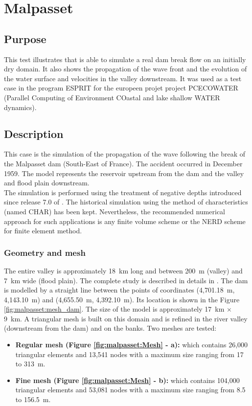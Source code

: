 \chapter{Malpasset}
\section{Purpose}
%
This test illustrates that  is able to simulate a real dam break flow
on an initially dry domain. It also shows the propagation of the wave front
and the evolution of the water surface and velocities in the valley downstream.
It was used as a test case in the program ESPRIT for the europeen projet project
PCECOWATER (Parallel Computing of Environment COastal and lake shallow WATER dynamics).
%
\section{Description}
%
This case is the simulation of the propagation of the wave following the break
of the Malpasset dam (South-East of France).
The accident occurred in December 1959.
The model represents the reservoir upstream from the dam and the valley and
flood plain downstream. \\

The simulation is performed using the treatment of negative depths introduced
since release 7.0 of .
The historical simulation using the method of characteristics (named CHAR) has
been kept.
Nevertheless, the recommended numerical approach for such applications is any
finite volume scheme or the NERD scheme for finite element method.

\subsection{Geometry and mesh}
The entire valley is approximately 18~km long and between 200~m (valley) and
7~km wide (flood plain).
The complete study is described in details in \cite{Hervouet2007}.
The dam is modelled by a straight line between the points of coordinates
(4,701.18~m, 4,143.10~m) and (4,655.50~m, 4,392.10~m).
Its location is shown in the Figure \ref{fig:malpasset:mesh_dam}.
The size of the model is approximately  17~km $\times$ 9~km.
A triangular mesh is built on this domain and is refined in the river valley
(downstream from the dam) and on the banks.
Two meshes are tested:
\begin{itemize}
\item \textbf{Regular mesh (Figure \ref{fig:malpasset:Mesh} - a):}
which contains 26,000 triangular elements and 13,541 nodes with a maximum size
ranging from 17 to 313~m.\\
\item \textbf{Fine mesh (Figure \ref{fig:malpasset:Mesh} - b):}
which contains 104,000 triangular elements and 53,081 nodes with a maximum size
ranging from 8.5 to 156.5~m.
\end{itemize}

